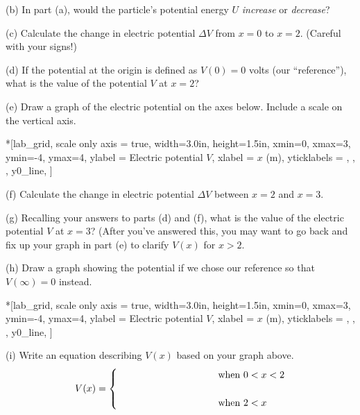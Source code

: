 (b) In part (a), would the particle's potential energy $U$ \textit{increase} or \textit{decrease}?
\answerspace{0.7in}

(c) Calculate the change in electric potential $\Delta V$ from $x=0$ to $x=2$. (Careful with your signs!)
\answerspace{0.9in}

(d) If the potential at the origin is defined as $V(0)=0$ volts (our ``reference''), what is the value of the potential $V$ at $x=2$?
\answerspace{0.7in}

\pagebreak
(e) Draw a graph of the electric potential on the axes below.  Include a scale on the vertical axis.

\begin{lab_axis}*[lab_grid,
	scale only axis = true,
	width={3.0in}, height={1.5in},
	xmin=0, xmax=3,
	ymin=-4, ymax=4,
	ylabel = {Electric potential $V$},
	xlabel = {$x$ (m)},
	yticklabels = { , , },
	y0_line,
]
\end{lab_axis}

(f) Calculate the change in electric potential $\Delta V$ between $x=2$ and $x=3$.
\answerspace{0.5in}

(g) Recalling your answers to parts (d) and (f), what is the value of the electric potential $V$ at $x=3$?  (After you've answered this, you may want to go back and fix up your graph in part (e) to clarify $V(x)$ for $x>2$.
\answerspace{0.5in}

(h) Draw a graph showing the potential if we chose our reference so that $V(\infty)=0$ instead.  

\begin{lab_axis}*[lab_grid,
	scale only axis = true,
	width={3.0in}, height={1.5in},
	xmin=0, xmax=3,
	ymin=-4, ymax=4,
	ylabel = {Electric potential $V$},
	xlabel = {$x$ (m)},
	yticklabels = { , , },
	y0_line,
]
\end{lab_axis}

(i) Write an equation describing $V(x)$ based on your graph above.
\begin{displaymath}
V(x) = \begin{cases}
        \rule{1.3in}{0in}  & \textrm{when } 0<x<2\\
        \\
        \hspace{1.3in} & \textrm{when }  2 < x
        \end{cases}
\end{displaymath}
\answerspace{0.1in}

